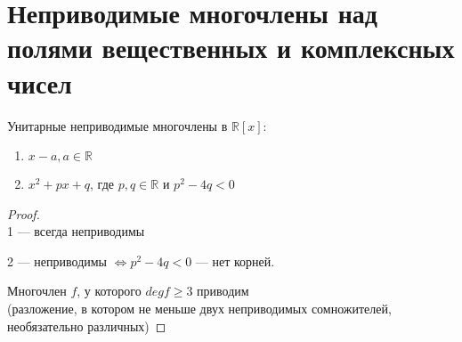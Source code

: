 \section{Неприводимые многочлены над полями вещественных и комплексных чисел}

\begin{theorem-non}
    Унитарные неприводимые многочлены в $\mathbb{R}[x]:$
    \begin{enumerate}
        \item $x - a, a \in \mathbb{R}$
        \item $x^2 + px + q$, где $p,q \in \mathbb{R}$ и $p^2 - 4q < 0$
    \end{enumerate}

    \begin{proof} $ $ \\
        1 --- всегда неприводимы

        2 --- неприводимы
        $\Longleftrightarrow p^2 - 4q < 0$ --- нет корней. 
        
        Многочлен $f$, у которого $deg f \geqslant 3$ приводим \\
        (разложение, в котором не меньше двух
        неприводимых сомножителей, необязательно
        различных) 
    \end{proof}
\end{theorem-non}